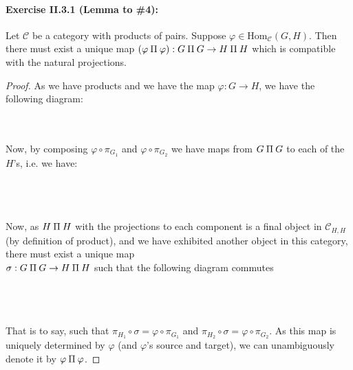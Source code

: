 \documentclass[12pt,letterpaper]{article}
\newcommand{\invamalg}{\mathbin{\text{\rotatebox[origin=c]{180}{$\amalg$}}}}
\newcommand{\Hom}{\mathrm{Hom}}
\begin{document}
\pagebreak
\paragraph{Exercise II.3.1 (Lemma to \#4):} Let  $\mathscr{C}$ be a category with products of pairs. Suppose $\varphi \in \Hom_{\mathscr{C}}(G,H)$. Then there must exist a unique map $(\varphi \invamalg \varphi):G\invamalg G \rightarrow H\invamalg H$ which is compatible with the natural projections.
\begin{proof}
As we have products and we have the map $\varphi: G \rightarrow H$, we have the following diagram:\\
	\\\\
	
	Now, by composing $\varphi \circ \pi_{G_1}$ and $\varphi \circ \pi_{G_2}$ we have maps from $G\invamalg G$ to each of the $H$'s, i.e. we have:\\\\
	\\\\
	
	
	Now, as $H\invamalg H$ with the projections to each component is a final object in $\mathscr{C}_{H,H}$ (by definition of product), and we have exhibited another object in this category, there must exist a unique map\\ 
	$\sigma: G\invamalg G \rightarrow H\invamalg H$ such that the following diagram commutes\\\\
	\\\\
	
	That is to say, such that $\pi_{H_1} \circ \sigma = \varphi\circ\pi_{G_1}$ and $\pi_{H_2} \circ \sigma = \varphi\circ\pi_{G_2}$. As this map is uniquely determined by $\varphi$ (and $\varphi$'s source and target), we can unambiguously denote it by $\varphi\invamalg \varphi$. 
\end{proof}
\end{document}
